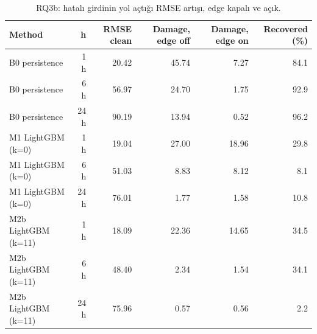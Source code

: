 \begin{table}[t]
\caption{RQ3b: hatalı girdinin yol açtığı RMSE artışı, edge kapalı ve açık.}
\label{tab:rq3b}
\centering\footnotesize
\begin{tabular}{lrrrrr}
\toprule
Method & h & RMSE clean & Damage, edge off & Damage, edge on & Recovered (\%) \\
\midrule
B0 persistence & 1 h & 20.42 & 45.74 & 7.27 & 84.1 \\
B0 persistence & 6 h & 56.97 & 24.70 & 1.75 & 92.9 \\
B0 persistence & 24 h & 90.19 & 13.94 & 0.52 & 96.2 \\
M1 LightGBM (k=0) & 1 h & 19.04 & 27.00 & 18.96 & 29.8 \\
M1 LightGBM (k=0) & 6 h & 51.03 & 8.83 & 8.12 & 8.1 \\
M1 LightGBM (k=0) & 24 h & 76.01 & 1.77 & 1.58 & 10.8 \\
M2b LightGBM (k=11) & 1 h & 18.09 & 22.36 & 14.65 & 34.5 \\
M2b LightGBM (k=11) & 6 h & 48.40 & 2.34 & 1.54 & 34.1 \\
M2b LightGBM (k=11) & 24 h & 75.96 & 0.57 & 0.56 & 2.2 \\
\bottomrule
\end{tabular}
\end{table}
